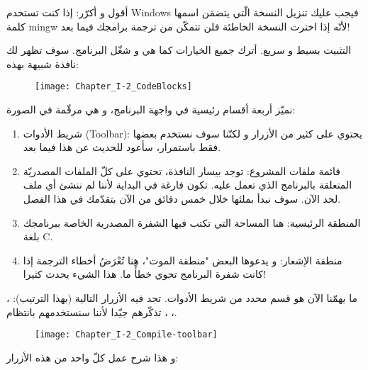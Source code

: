 \begin{critical}
أقول و أكرّر: إذا كنت تستخدم
\textenglish{Windows}
فيجب عليك تنزيل النسخة الّتي يتضمَن اسمها كلمة
\textenglish{mingw}
لأنّه إذا اخترت النسخة الخاطئة فلن تتمكّن من ترجمة برامجك فيما بعد!
\end{critical}

التثبيت بسيط و سريع.  أترك جميع الخيارات كما هي و شغّل البرنامج. سوف تظهر لك نافذة شبيهة بهذه:

\begin{figure}[H]
	\centering
	\texttt{[image: Chapter\_I-2\_CodeBlocks]}
\end{figure}

نميّز أربعة أقسام رئيسية في واجهة البرنامج، و هي مرقّمة في الصورة:

\begin{enumerate}
  \item شريط الأدوات
(\textenglish{Toolbar}):
يحتوي على كثير من الأزرار و لكنّنا سوف نستخدم بعضها فقط باستمرار، سأعود للحديث عن هذا فيما بعد.
  \item قائمة ملفات المشروع: توجد بيسار النافذة، تحتوي على كلّ الملفات المصدريّة المتعلقة بالبرنامج الذي تعمل عليه. تكون فارغة في البداية لأننا لم ننشئ أي ملف لحد الآن. سوف نبدأ بملئها خلال خمس دقائق من الآن بتقدّمك في هذا الفصل.
  \item المنطقة الرئيسية: هنا المساحة التي تكتب فيها الشفرة المصدرية الخاصة ببرنامجك بلغة \textenglish{C}.
  \item منطقة الإشعار: و يدعوها البعض "منطقة الموت"، هنا تُعْرَضُ أخطاء الترجمة إذا كانت شفرة البرنامج تحوي خطأً ما. هذا الشيء يحدث كثيرا!
\end{enumerate}

ما يهمّنا الآن هو قسم محدد من شريط الأدوات. تجد فيه الأزرار التالية (بهذا الترتيب):
،
،
،
تذكّرهم جيّدا لأننا سنستخدمهم بانتظام.

\begin{figure}[H]
	\centering
	\texttt{[image: Chapter\_I-2\_Compile-toolbar]}
\end{figure}

و هذا شرح عمل كلّ واحد من هذه الأزرار:

